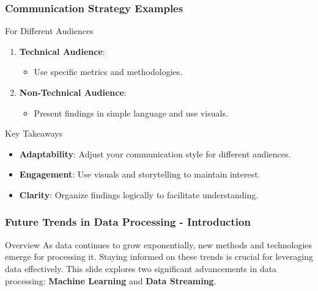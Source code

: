 \documentclass[aspectratio=169]{beamer}
\begin{document}
\begin{frame}[fragile]
    \frametitle{Communication Strategy Examples}
    \begin{block}{For Different Audiences}
        \begin{enumerate}
            \item \textbf{Technical Audience}:
                \begin{itemize}
                    \item Use specific metrics and methodologies.
                \end{itemize}
            \item \textbf{Non-Technical Audience}:
                \begin{itemize}
                    \item Present findings in simple language and use visuals.
                \end{itemize}
        \end{enumerate}
    \end{block}
    
    \begin{block}{Key Takeaways}
        \begin{itemize}
            \item \textbf{Adaptability}: Adjust your communication style for different audiences.
            \item \textbf{Engagement}: Use visuals and storytelling to maintain interest.
            \item \textbf{Clarity}: Organize findings logically to facilitate understanding.
        \end{itemize}
    \end{block}
\end{frame}

\begin{frame}[fragile]
    \frametitle{Future Trends in Data Processing - Introduction}
    \begin{block}{Overview}
        As data continues to grow exponentially, new methods and technologies emerge for processing it. Staying informed on these trends is crucial for leveraging data effectively. This slide explores two significant advancements in data processing: \textbf{Machine Learning} and \textbf{Data Streaming}.
    \end{block}
\end{frame}
\end{document}
